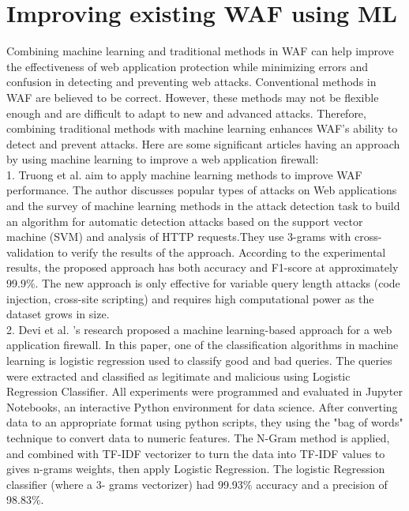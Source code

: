 \section{Improving existing WAF using ML}
\label{sec: improving_waf}
Combining machine learning and traditional methods in WAF can help improve the effectiveness of web application protection while minimizing errors and confusion in detecting and preventing web attacks. Conventional methods in WAF are believed to be correct. However, these methods may not be flexible enough and are difficult to adapt to new and advanced attacks. Therefore, combining traditional methods with machine learning enhances WAF's ability to detect and prevent attacks.
Here are some significant articles having an approach by using machine learning to improve a web application firewall: \\
1.	Truong et al. \cite{Truong}  aim to apply machine learning methods  to  improve  WAF  performance.  The author discusses popular types of attacks on Web applications and the survey of machine learning methods in the attack detection task to build  an  algorithm  for  automatic  detection attacks based on the support vector machine (SVM) and analysis of HTTP requests.They use 3-grams with cross-validation to verify the results of the approach. According to the experimental results, the proposed approach has both accuracy and F1-score at approximately 99.9\%. The new approach is only effective for variable query length attacks (code injection, cross-site scripting) and requires high computational power as the dataset grows in size.\\
2.	Devi et al. \cite{Devi}'s research proposed a machine learning-based approach for a web application firewall. In this paper, one of the classification algorithms in machine learning is logistic regression used to classify good and bad queries. The queries were extracted and classified as legitimate and malicious using Logistic Regression Classifier. All experiments were programmed and evaluated in
Jupyter Notebooks, an interactive Python environment for data science. After converting data to an appropriate format using python scripts, they using the "bag of words" technique to convert data to numeric features. The N-Gram method is applied, and combined with TF-IDF vectorizer to turn the data into TF-IDF values to gives n-grams weights, then apply Logistic Regression. The logistic Regression classifier (where a 3- grams vectorizer) had 99.93\% accuracy and a precision of 98.83\%. \\
